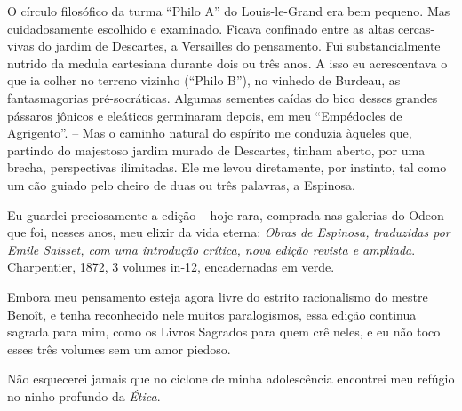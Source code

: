 O círculo filosófico da turma ``Philo A'' do Louis-le-Grand era bem
pequeno. Mas cuidadosamente escolhido e examinado. Ficava confinado
entre as altas cercas-vivas do jardim de Descartes, a Versailles do
pensamento. Fui substancialmente nutrido da medula cartesiana durante
dois ou três anos. A isso eu acrescentava o que ia colher no terreno
vizinho (``Philo B''), no vinhedo de Burdeau, as fantasmagorias
pré-socráticas. Algumas sementes caídas do bico desses grandes pássaros
jônicos e eleáticos germinaram depois, em meu ``Empédocles de
Agrigento''. -- Mas o caminho natural do espírito me conduzia àqueles
que, partindo do majestoso jardim murado de Descartes, tinham aberto,
por uma brecha, perspectivas ilimitadas. Ele me levou diretamente, por
instinto, tal como um cão guiado pelo cheiro de duas ou três palavras, a
Espinosa.

Eu guardei preciosamente a edição -- hoje rara, comprada nas galerias do
Odeon -- que foi, nesses anos, meu elixir da vida eterna: \emph{Obras de
Espinosa, traduzidas por Emile Saisset, com uma introdução crítica, nova
edição revista e ampliada}. Charpentier, 1872, 3 volumes in-12,
encadernadas em verde.

Embora meu pensamento esteja agora livre do estrito racionalismo do
mestre Benoît, e tenha reconhecido nele muitos paralogismos, essa edição
continua sagrada para mim, como os Livros Sagrados para quem crê neles,
e eu não toco esses três volumes sem um amor piedoso.

Não esquecerei jamais que no ciclone de minha adolescência encontrei meu
refúgio no ninho profundo da \emph{Ética}.

